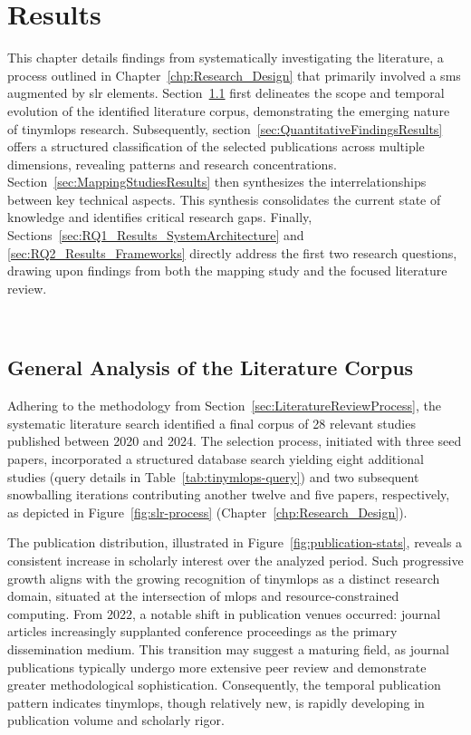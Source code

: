 
\chapter{Results}
\label{chp:Research_Results}

This chapter details findings from systematically investigating the literature, a process outlined in Chapter~\ref{chp:Research_Design} that primarily involved a \gls{sms} augmented by \gls{slr} elements. Section~\ref{sec:GeneralAnalysisResults} first delineates the scope and temporal evolution of the identified literature corpus, demonstrating the emerging nature of \gls{tinymlops} research. Subsequently, section~\ref{sec:QuantitativeFindingsResults} offers a structured classification of the selected publications across multiple dimensions, revealing patterns and research concentrations. Section~\ref{sec:MappingStudiesResults} then synthesizes the interrelationships between key technical aspects. This synthesis consolidates the current state of knowledge and identifies critical research gaps. Finally, Sections~\ref{sec:RQ1_Results_SystemArchitecture} and \ref{sec:RQ2_Results_Frameworks} directly address the first two research questions, drawing upon findings from both the mapping study and the focused literature review.

~\\
\vfill
\minitoc
\clearpage

\section{General Analysis of the Literature Corpus}
\label{sec:GeneralAnalysisResults}

Adhering to the methodology from Section~\ref{sec:LiteratureReviewProcess}, the systematic literature search identified a final corpus of 28 relevant studies published between 2020 and 2024. The selection process, initiated with three seed papers, incorporated a structured database search yielding eight additional studies (query details in Table~\ref{tab:tinymlops-query}) and two subsequent snowballing iterations \cite{wohlinGuidelinesSnowballingSystematic2014a} contributing another twelve and five papers, respectively, as depicted in Figure~\ref{fig:slr-process} (Chapter~\ref{chp:Research_Design}).

The publication distribution, illustrated in Figure~\ref{fig:publication-stats}, reveals a consistent increase in scholarly interest over the analyzed period. Such progressive growth aligns with the growing recognition of \gls{tinymlops} as a distinct research domain, situated at the intersection of \gls{mlops} and resource-constrained computing. From 2022, a notable shift in publication venues occurred: journal articles increasingly supplanted conference proceedings as the primary dissemination medium. This transition may suggest a maturing field, as journal publications typically undergo more extensive peer review and demonstrate greater methodological sophistication. Consequently, the temporal publication pattern indicates \gls{tinymlops}, though relatively new, is rapidly developing in publication volume and scholarly rigor.



